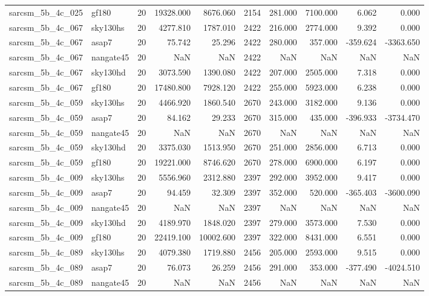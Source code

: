 \begin{longtable}{llrrrrrrrr}
sarcsm\_5b\_4c\_025 & gf180 & 20 & 19328.000 & 8676.060 & 2154 & 281.000 & 7100.000 & 6.062 & 0.000 \\
sarcsm\_5b\_4c\_067 & sky130hs & 20 & 4277.810 & 1787.010 & 2422 & 216.000 & 2774.000 & 9.392 & 0.000 \\
sarcsm\_5b\_4c\_067 & asap7 & 20 & 75.742 & 25.296 & 2422 & 280.000 & 357.000 & -359.624 & -3363.650 \\
sarcsm\_5b\_4c\_067 & nangate45 & 20 & NaN & NaN & 2422 & NaN & NaN & NaN & NaN \\
sarcsm\_5b\_4c\_067 & sky130hd & 20 & 3073.590 & 1390.080 & 2422 & 207.000 & 2505.000 & 7.318 & 0.000 \\
sarcsm\_5b\_4c\_067 & gf180 & 20 & 17480.800 & 7928.120 & 2422 & 255.000 & 5923.000 & 6.238 & 0.000 \\
sarcsm\_5b\_4c\_059 & sky130hs & 20 & 4466.920 & 1860.540 & 2670 & 243.000 & 3182.000 & 9.136 & 0.000 \\
sarcsm\_5b\_4c\_059 & asap7 & 20 & 84.162 & 29.233 & 2670 & 315.000 & 435.000 & -396.933 & -3734.470 \\
sarcsm\_5b\_4c\_059 & nangate45 & 20 & NaN & NaN & 2670 & NaN & NaN & NaN & NaN \\
sarcsm\_5b\_4c\_059 & sky130hd & 20 & 3375.030 & 1513.950 & 2670 & 251.000 & 2856.000 & 6.713 & 0.000 \\
sarcsm\_5b\_4c\_059 & gf180 & 20 & 19221.000 & 8746.620 & 2670 & 278.000 & 6900.000 & 6.197 & 0.000 \\
sarcsm\_5b\_4c\_009 & sky130hs & 20 & 5556.960 & 2312.880 & 2397 & 292.000 & 3952.000 & 9.417 & 0.000 \\
sarcsm\_5b\_4c\_009 & asap7 & 20 & 94.459 & 32.309 & 2397 & 352.000 & 520.000 & -365.403 & -3600.090 \\
sarcsm\_5b\_4c\_009 & nangate45 & 20 & NaN & NaN & 2397 & NaN & NaN & NaN & NaN \\
sarcsm\_5b\_4c\_009 & sky130hd & 20 & 4189.970 & 1848.020 & 2397 & 279.000 & 3573.000 & 7.530 & 0.000 \\
sarcsm\_5b\_4c\_009 & gf180 & 20 & 22419.100 & 10002.600 & 2397 & 322.000 & 8431.000 & 6.551 & 0.000 \\
sarcsm\_5b\_4c\_089 & sky130hs & 20 & 4079.380 & 1719.880 & 2456 & 205.000 & 2593.000 & 9.515 & 0.000 \\
sarcsm\_5b\_4c\_089 & asap7 & 20 & 76.073 & 26.259 & 2456 & 291.000 & 353.000 & -377.490 & -4024.510 \\
sarcsm\_5b\_4c\_089 & nangate45 & 20 & NaN & NaN & 2456 & NaN & NaN & NaN & NaN \\

\end{longtable}
